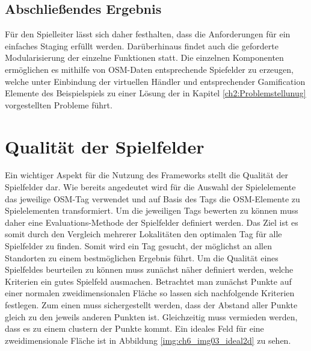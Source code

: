 \subsection*{Abschließendes Ergebnis}

Für den Spielleiter lässt sich daher festhalten, dass die Anforderungen für ein einfaches Staging erfüllt werden. Darüberhinaus findet auch die geforderte Modularisierung der einzelne Funktionen statt. Die einzelnen Komponenten ermöglichen es mithilfe von OSM-Daten entsprechende Spiefelder zu erzeugen, welche unter Einbindung der virtuellen Händler und entsprechender Gamification Elemente des Beispielspiels zu einer Lösung der in Kapitel \ref{ch2:Problemstellunug} vorgestellten Probleme führt.


\section{Qualität der Spielfelder}
\label{ch:CH6_qualtiy_of_gameboards}

Ein wichtiger Aspekt für die Nutzung des Frameworks stellt die Qualität der Spielfelder dar.
Wie bereits angedeutet wird für die Auswahl der Spielelemente das jeweilige OSM-Tag verwendet und auf Basis des Tags die OSM-Elemente zu Spielelementen transformiert. Um die jeweiligen Tags bewerten zu können muss daher eine Evaluations-Methode der Spielfelder definiert werden.
Das Ziel ist es somit durch den Vergleich mehrerer Lokalitäten den optimalen Tag für alle Spielfelder zu finden. Somit wird ein Tag gesucht, der möglichst an allen Standorten zu einem bestmöglichen Ergebnis führt.
Um die Qualität eines Spielfeldes beurteilen zu können muss zunächst näher definiert werden, welche Kriterien ein gutes Spielfeld ausmachen. 
Betrachtet man zunächst Punkte auf einer normalen zweidimensionalen Fläche so lassen sich nachfolgende Kriterien festlegen.
Zum einen muss sichergestellt werden, dass der Abstand aller Punkte gleich zu den jeweils anderen Punkten ist. Gleichzeitig muss vermieden werden, dass es zu einem clustern der Punkte kommt. Ein ideales Feld für eine zweidimensionale Fläche ist in Abbildung \ref{img:ch6_img03_ideal2d} zu sehen.

